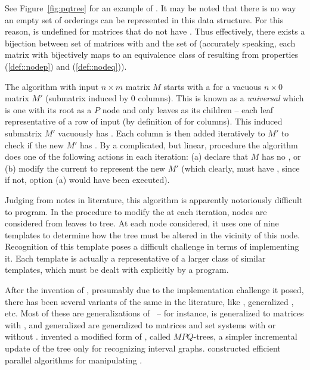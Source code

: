 See Figure~\ref{fig:pqtree} for an example of \PQtree. It may be noted
that there is no way an empty set of \COP orderings can be represented
in this data structure. For this reason, \PQtree is undefined for
matrices that do not have \COP.  Thus effectively, there exists a
bijection between set of matrices with \COP and the set of \PQtrees
(accurately speaking, each matrix with \COP bijectively maps to an
equivalence class of \PQtrees resulting from properties (\ref{def::nodep}) and
(\ref{def::nodeq})).


\figpqtree

The \cite{bl76} algorithm with input $n \times m$ matrix $M$ starts
with a \PQtree for a vacuous $n \times 0$ matrix $M'$ (submatrix
induced by 0 columns). This is known as a {\em universal} \PQtree
which is one with its root as a $P$ node and only leaves as its
children -- each leaf representative of a row of input (by definition
of \COP for columns). This induced submatrix $M'$ vacuously has \COP.
Each column is then added iteratively to $M'$ to check if the new $M'$
has \COP.  By a complicated, but linear, procedure the algorithm does
one of the following actions in each iteration: (a) declare that $M$
has no \COP, or (b) modify the current \PQtree to represent the new
$M'$ (which clearly, must have \COP, since if not, option (a) would
have been executed).


Judging from notes in literature, this algorithm is apparently
notoriously difficult to program. In the procedure to modify the
\PQtree at each iteration, nodes are considered from leaves to
tree. At each node considered, it uses one of nine templates to
determine how the tree must be altered in the vicinity of this
node. Recognition of this template poses a difficult challenge in
terms of implementing it. Each template is actually a representative
of a larger class of similar templates, which must be dealt with
explicitly by a program\cite{mcc04}.


After the invention of \PQtrees, presumably due to the implementation
challenge it posed, there has been several variants of the same in the
literature, like \PCtree \cite{sh99,wlh01,hm03}, generalized \PQtree
\cite{km89,mcc04}, \PQRtree \cite{mm96,mpt98} etc. Most of these are
generalizations of \PQtree\ -- for instance, \PCtree is generalized to
matrices with \CROP, \PQRtree and generalized \PQtree are generalized
to matrices and set systems with or without \COP. \cite{km89} invented
a modified form of \PQtree, called $MPQ$-trees, a simpler incremental
update of the tree only for recognizing interval graphs.  \cite{kr88}
constructed efficient parallel algorithms for manipulating \PQtrees.

